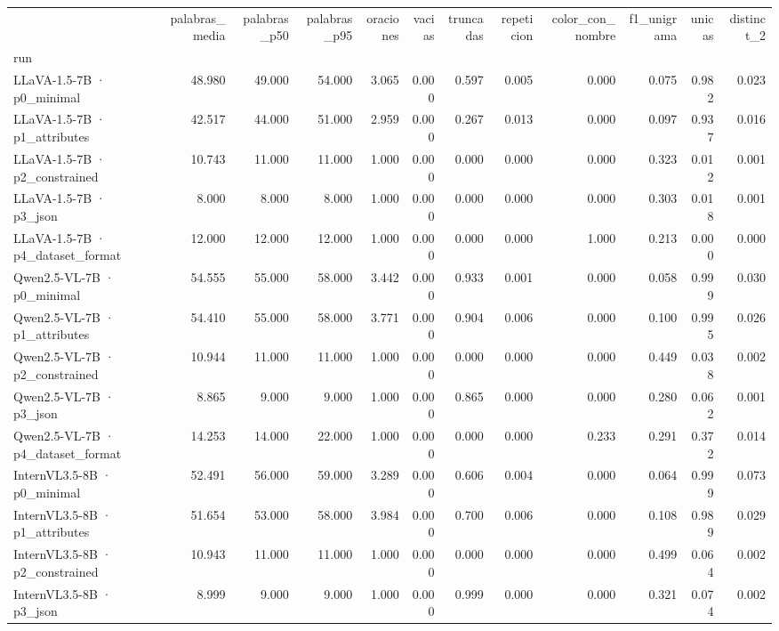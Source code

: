 \begin{tabular}{lrrrrrrrrrrr}
\toprule
 & palabras\_media & palabras\_p50 & palabras\_p95 & oraciones & vacias & truncadas & repeticion & color\_con\_nombre & f1\_unigrama & unicas & distinct\_2 \\
run &  &  &  &  &  &  &  &  &  &  &  \\
\midrule
LLaVA-1.5-7B · p0\_minimal & 48.980 & 49.000 & 54.000 & 3.065 & 0.000 & 0.597 & 0.005 & 0.000 & 0.075 & 0.982 & 0.023 \\
LLaVA-1.5-7B · p1\_attributes & 42.517 & 44.000 & 51.000 & 2.959 & 0.000 & 0.267 & 0.013 & 0.000 & 0.097 & 0.937 & 0.016 \\
LLaVA-1.5-7B · p2\_constrained & 10.743 & 11.000 & 11.000 & 1.000 & 0.000 & 0.000 & 0.000 & 0.000 & 0.323 & 0.012 & 0.001 \\
LLaVA-1.5-7B · p3\_json & 8.000 & 8.000 & 8.000 & 1.000 & 0.000 & 0.000 & 0.000 & 0.000 & 0.303 & 0.018 & 0.001 \\
LLaVA-1.5-7B · p4\_dataset\_format & 12.000 & 12.000 & 12.000 & 1.000 & 0.000 & 0.000 & 0.000 & 1.000 & 0.213 & 0.000 & 0.000 \\
Qwen2.5-VL-7B · p0\_minimal & 54.555 & 55.000 & 58.000 & 3.442 & 0.000 & 0.933 & 0.001 & 0.000 & 0.058 & 0.999 & 0.030 \\
Qwen2.5-VL-7B · p1\_attributes & 54.410 & 55.000 & 58.000 & 3.771 & 0.000 & 0.904 & 0.006 & 0.000 & 0.100 & 0.995 & 0.026 \\
Qwen2.5-VL-7B · p2\_constrained & 10.944 & 11.000 & 11.000 & 1.000 & 0.000 & 0.000 & 0.000 & 0.000 & 0.449 & 0.038 & 0.002 \\
Qwen2.5-VL-7B · p3\_json & 8.865 & 9.000 & 9.000 & 1.000 & 0.000 & 0.865 & 0.000 & 0.000 & 0.280 & 0.062 & 0.001 \\
Qwen2.5-VL-7B · p4\_dataset\_format & 14.253 & 14.000 & 22.000 & 1.000 & 0.000 & 0.000 & 0.000 & 0.233 & 0.291 & 0.372 & 0.014 \\
InternVL3.5-8B · p0\_minimal & 52.491 & 56.000 & 59.000 & 3.289 & 0.000 & 0.606 & 0.004 & 0.000 & 0.064 & 0.999 & 0.073 \\
InternVL3.5-8B · p1\_attributes & 51.654 & 53.000 & 58.000 & 3.984 & 0.000 & 0.700 & 0.006 & 0.000 & 0.108 & 0.989 & 0.029 \\
InternVL3.5-8B · p2\_constrained & 10.943 & 11.000 & 11.000 & 1.000 & 0.000 & 0.000 & 0.000 & 0.000 & 0.499 & 0.064 & 0.002 \\
InternVL3.5-8B · p3\_json & 8.999 & 9.000 & 9.000 & 1.000 & 0.000 & 0.999 & 0.000 & 0.000 & 0.321 & 0.074 & 0.002 \\

\end{tabular}

